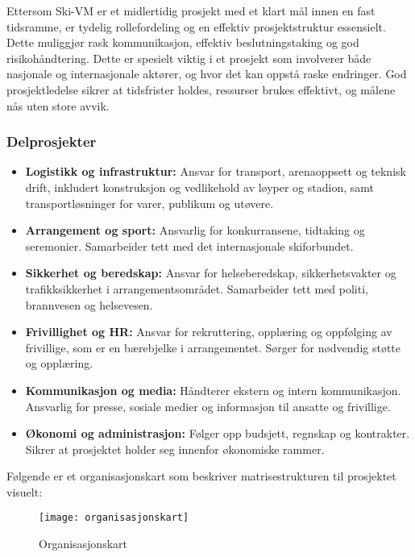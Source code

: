 Ettersom Ski-VM er et midlertidig prosjekt med et klart mål innen en fast tidsramme, er tydelig rollefordeling og en effektiv prosjektstruktur essensielt. Dette muliggjør rask kommunikasjon, effektiv beslutningstaking og god risikohåndtering. Dette er spesielt viktig i et prosjekt som involverer både nasjonale og internasjonale aktører, og hvor det kan oppstå raske endringer. God prosjektledelse sikrer at tidsfrister holdes, ressurser brukes effektivt, og målene nås uten store avvik.

\subsubsection*{Delprosjekter}

\begin{itemize}
    \item \textbf{Logistikk og infrastruktur:} Ansvar for transport, arenaoppsett og teknisk drift, inkludert konstruksjon og vedlikehold av løyper og stadion, samt transportløsninger for varer, publikum og utøvere.
    
    \item \textbf{Arrangement og sport:} Ansvarlig for konkurransene, tidtaking og seremonier. Samarbeider tett med det internasjonale skiforbundet.
    
    \item \textbf{Sikkerhet og beredskap:} Ansvar for helseberedskap, sikkerhetsvakter og trafikksikkerhet i arrangementsområdet. Samarbeider tett med politi, brannvesen og helsevesen.
    
    \item \textbf{Frivillighet og HR:} Ansvar for rekruttering, opplæring og oppfølging av frivillige, som er en bærebjelke i arrangementet. Sørger for nødvendig støtte og opplæring.
    
    \item \textbf{Kommunikasjon og media:} Håndterer ekstern og intern kommunikasjon. Ansvarlig for presse, sosiale medier og informasjon til ansatte og frivillige.
    
    \item \textbf{Økonomi og administrasjon:} Følger opp budsjett, regnskap og kontrakter. Sikrer at prosjektet holder seg innenfor økonomiske rammer.
    \end{itemize}
Følgende er et organisasjonskart som beskriver matrisestrukturen til prosjektet visuelt:
\begin{figure}[h]
    \centering
    \texttt{[image: organisasjonskart]}
    \caption{Organisasjonskart}
    \label{fig:organisasjonskart}
\end{figure}